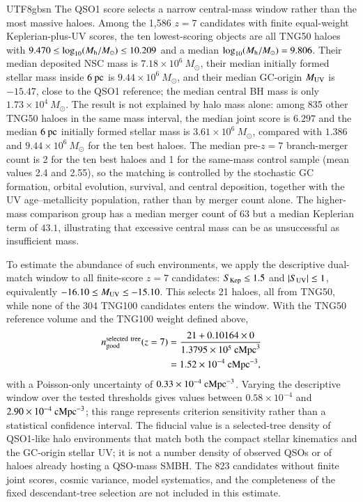 \documentclass[trackchanges, twocolappendix, twocolumn]{aastex701}
\begin{document}
\begin{CJK*}{UTF8}{gbsn}
The QSO1 score selects a narrow central-mass window rather than the most massive haloes. Among the 1,586 $z=7$ candidates with finite equal-weight Keplerian-plus-UV scores, the ten lowest-scoring objects are all TNG50 haloes with $9.470\leq\log_{10}(M_{\rm h}/M_\odot)\leq10.209$ and a median $\log_{10}(M_{\rm h}/M_\odot)=9.806$. Their median deposited NSC mass is $7.18\times10^6~M_\odot$, their median initially formed stellar mass inside $6~{\rm pc}$ is $9.44\times10^6~M_\odot$, and their median GC-origin $M_{\rm UV}$ is $-15.47$, close to the QSO1 reference; the median central BH mass is only $1.73\times10^4~M_\odot$. The result is not explained by halo mass alone: among 835 other TNG50 haloes in the same mass interval, the median joint score is $6.297$ and the median $6~{\rm pc}$ initially formed stellar mass is $3.61\times10^6~M_\odot$, compared with $1.386$ and $9.44\times10^6~M_\odot$ for the ten best haloes. The median pre-$z=7$ branch-merger count is 2 for the ten best haloes and 1 for the same-mass control sample (mean values 2.4 and 2.55), so the matching is controlled by the stochastic GC formation, orbital evolution, survival, and central deposition, together with the UV age--metallicity population, rather than by merger count alone. The higher-mass comparison group has a median merger count of 63 but a median Keplerian term of $43.1$, illustrating that excessive central mass can be as unsuccessful as insufficient mass.

To estimate the abundance of such environments, we apply the descriptive dual-match window to all finite-score $z=7$ candidates: $S_{\rm Kep}\leq1.5$ and $|S_{\rm UV}|\leq1$, equivalently $-16.10\leq M_{\rm UV}\leq-15.10$. This selects 21 haloes, all from TNG50, while none of the 304 TNG100 candidates enters the window. With the TNG50 reference volume and the TNG100 weight defined above,
\begin{align}
n_{\rm good}^{\rm selected\ tree}(z = 7) & = \dfrac{21 + 0.10164 \times 0}{1.3795 \times 10^5~{\rm cMpc}^{3}} \\
& = 1.52 \times 10^{-4}~{\rm cMpc}^{-3},
\end{align}
with a Poisson-only uncertainty of $0.33\times10^{-4}~{\rm cMpc}^{-3}$. Varying the descriptive window over the tested thresholds gives values between $0.58\times10^{-4}$ and $2.90\times10^{-4}~{\rm cMpc}^{-3}$; this range represents criterion sensitivity rather than a statistical confidence interval. The fiducial value is a selected-tree density of QSO1-like halo environments that match both the compact stellar kinematics and the GC-origin stellar UV; it is not a number density of observed QSOs or of haloes already hosting a QSO-mass SMBH. The 823 candidates without finite joint scores, cosmic variance, model systematics, and the completeness of the fixed descendant-tree selection are not included in this estimate.


\end{CJK*}
\end{document}
